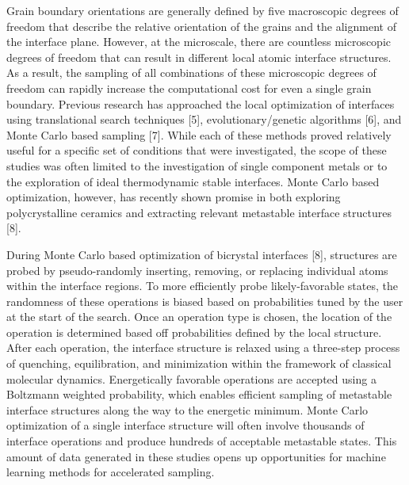 \documentclass[aip,reprint,longbibliography,amsmath,amssymb,twocolumn,superscriptaddress]{revtex4-1}
\begin{document}
Grain boundary orientations are generally defined by five macroscopic degrees of freedom that describe the relative orientation of the grains and the alignment of the interface plane. 
%
However, at the microscale, there are countless microscopic degrees of freedom that can result in different local atomic interface structures. 
%
As a result, the sampling of all combinations of these microscopic degrees of freedom can rapidly increase the computational cost for even a single grain boundary. 
%
Previous research has approached the local optimization of interfaces using translational search techniques [5], evolutionary/genetic algorithms [6], and Monte Carlo based sampling [7]. 
%
While each of these methods proved relatively useful for a specific set of conditions that were investigated, the scope of these studies was often limited to the investigation of single component metals or to the exploration of ideal thermodynamic stable interfaces. 
%
Monte Carlo based optimization, however, has recently shown promise in both exploring polycrystalline ceramics and extracting relevant metastable interface structures [8]. 

During Monte Carlo based optimization of bicrystal interfaces [8], structures are probed by pseudo-randomly inserting, removing, or replacing individual atoms within the interface regions. 
%
To more efficiently probe likely-favorable states, the randomness of these operations is biased based on probabilities tuned by the user at the start of the search. 
%
Once an operation type is chosen, the location of the operation is determined based off probabilities defined by the local structure. 
%
After each operation, the interface structure is relaxed using a three-step process of quenching, equilibration, and minimization within the framework of classical molecular dynamics. 
%
Energetically favorable operations are accepted using a Boltzmann weighted probability, which enables efficient sampling of metastable interface structures along the way to the energetic minimum. 
%
Monte Carlo optimization of a single interface structure will often involve thousands of interface operations and produce hundreds of acceptable metastable states. 
%
This amount of data generated in these studies opens up opportunities for machine learning methods for accelerated sampling.  
\end{document}
